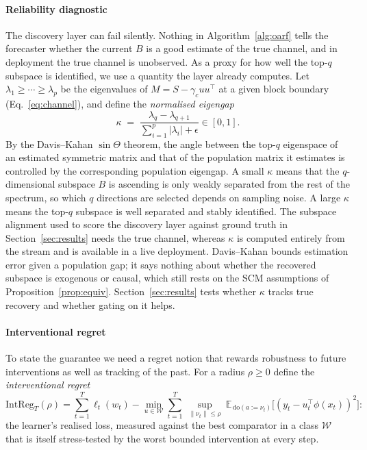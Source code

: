 \documentclass[authoryear,preprint,12pt]{elsarticle}
\theoremstyle{plain}
\theoremstyle{remark}
\newcommand{\E}{\mathbb{E}}
\newcommand{\doop}{\mathrm{do}}
\begin{document}
\paragraph{Reliability diagnostic} The discovery layer can fail silently. Nothing in
Algorithm~\ref{alg:oarf} tells the forecaster whether the current $B$ is a good
estimate of the true channel, and in deployment the true channel is unobserved. As a
proxy for how well the top-$q$ subspace is identified, we use a quantity the layer
already computes. Let $\lambda_1\ge\cdots\ge\lambda_p$ be the eigenvalues of
$M=S-\gamma_c uu^\top$ at a given block boundary (Eq.~\eqref{eq:channel}), and define
the \emph{normalised eigengap}
\begin{equation}\label{eq:eigengap}
 \kappa \;=\; \frac{\lambda_q-\lambda_{q+1}}{\sum_{i=1}^p|\lambda_i|+\epsilon}\in[0,1].
\end{equation}
By the Davis--Kahan $\sin\Theta$ theorem, the angle between the top-$q$ eigenspace of
an estimated symmetric matrix and that of the population matrix it estimates is
controlled by the corresponding population eigengap. A small $\kappa$ means that the $q$-dimensional subspace $B$ is ascending is only weakly separated from
the rest of the spectrum, so which $q$ directions are selected depends on sampling
noise. A large $\kappa$ means the top-$q$ subspace is well separated and stably
identified. The subspace alignment used to score the discovery layer against ground
truth in Section~\ref{sec:results} needs the true channel, whereas $\kappa$ is
computed entirely from the stream and is available in a live deployment.
Davis--Kahan bounds estimation error given a population gap; it says nothing about
whether the recovered subspace is exogenous or causal, which still rests on the SCM
assumptions of Proposition~\ref{prop:equiv}. Section~\ref{sec:results} tests whether
$\kappa$ tracks true recovery and whether gating on it helps.

\paragraph{Interventional regret} To state the guarantee we need a regret notion that
rewards robustness to future interventions as well as tracking of the past. For a
radius $\rho\ge 0$ define the \emph{interventional regret}
\begin{equation}\label{eq:intreg}
\mathrm{IntReg}_T(\rho)=\sum_{t=1}^T\ell_t(w_t)
 -\min_{u\in\mathcal{W}}\sum_{t=1}^T\ \sup_{\|\nu_t\|\le\rho}\
 \E_{\,\doop(a:=\nu_t)}\!\big[(y_t-u_t^\top\phi(x_t))^2\big]:
\end{equation}
the learner's realised loss, measured against the best comparator in a class
$\mathcal{W}$ that is itself stress-tested by the worst bounded intervention at every
step.
\end{document}
